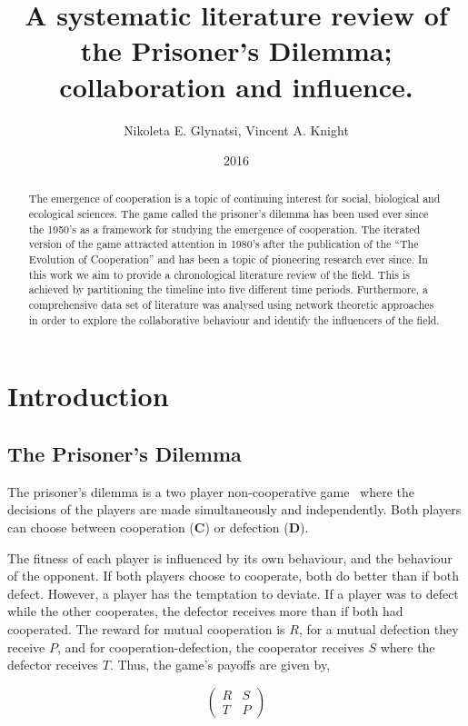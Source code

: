 \documentclass{article}
\title{A systematic literature review of the Prisoner's Dilemma; collaboration and influence.}
\author{Nikoleta E. Glynatsi, Vincent A. Knight}
\date{2016}
\theoremstyle{definition}
\begin{document}
\maketitle

\begin{abstract}
    The emergence of cooperation is a topic of continuing interest
    for social, biological and ecological sciences. The game called the prisoner's
    dilemma has been used ever since the 1950's as a framework for studying the emergence
    of cooperation. The iterated version of the game attracted attention in 1980's after
    the publication of the ``The Evolution of Cooperation'' and has been a topic
    of pioneering research ever since. In this work we aim to provide a chronological
    literature review of the field. This is achieved by partitioning the timeline into five different
    time periods. Furthermore, a comprehensive data set of literature was analysed
    using network theoretic approaches in order to explore the collaborative
    behaviour and identify the influencers of the field.
\end{abstract}

\section{Introduction}\label{section:introduction}

\subsection{The Prisoner's Dilemma}\label{section:prisoners_dilemma}

The prisoner's dilemma is a two player non-cooperative game~\cite{Flood1958} where
the decisions of the players are made simultaneously and independently. Both players
can choose between cooperation (\textbf{C}) or defection (\textbf{D}).

The fitness of each player is influenced by its own behaviour, and the behaviour
of the opponent. If both players choose to cooperate, both do better
than if both defect. However, a player has the temptation to deviate. If a
player was to defect while the other cooperates, the defector receives
more than if both had cooperated. The reward for mutual cooperation is \(R\),
for a mutual defection they receive \(P\), and for cooperation-defection,
the cooperator receives \(S\) where the defector receives \(T\). Thus, the game's
payoffs are given by,

\begin{equation} \label{eq:the_pd_payoffs}
    \begin{pmatrix}
    R & S \\ T & P
    \end{pmatrix}
\end{equation}
\end{document}
